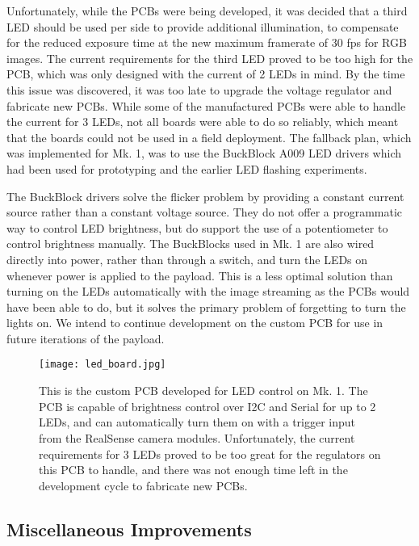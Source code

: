 Unfortunately, while the PCBs were being developed, it was decided that a third LED should be used per side to provide additional illumination, to compensate for the reduced exposure time at the new maximum framerate of 30 fps for RGB images. The current requirements for the third LED proved to be too high for the PCB, which was only designed with the current of 2 LEDs in mind. By the time this issue was discovered, it was too late to upgrade the voltage regulator and fabricate new PCBs. While some of the manufactured PCBs were able to handle the current for 3 LEDs, not all boards were able to do so reliably, which meant that the boards could not be used in a field deployment. The fallback plan, which was implemented for Mk. 1, was to use the BuckBlock A009 LED drivers which had been used for prototyping and the earlier LED flashing experiments.

The BuckBlock drivers solve the flicker problem by providing a constant current source rather than a constant voltage source. They do not offer a programmatic way to control LED brightness, but do support the use of a potentiometer to control brightness manually. The BuckBlocks used in Mk. 1 are also wired directly into power, rather than through a switch, and turn the LEDs on whenever power is applied to the payload. This is a less optimal solution than turning on the LEDs automatically with the image streaming as the PCBs would have been able to do, but it solves the primary problem of forgetting to turn the lights on. We intend to continue development on the custom PCB for use in future iterations of the payload.

\begin{figure}
	\centering
	\texttt{[image: led\_board.jpg]}
	\caption[Custom PCB for LED control on Mk. 1]{This is the custom PCB developed for LED control on Mk. 1. The PCB is capable of brightness control over I2C and Serial for up to 2 LEDs, and can automatically turn them on with a trigger input from the RealSense camera modules. Unfortunately, the current requirements for 3 LEDs proved to be too great for the regulators on this PCB to handle, and there was not enough time left in the development cycle to fabricate new PCBs.}
	\label{led_board}
\end{figure}

\subsection{Miscellaneous Improvements}

